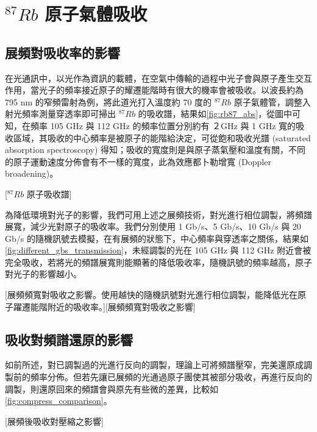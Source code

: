 \documentclass[class=NCU_thesis, crop=false]{standalone}
\begin{document}
\section{$^{87}Rb$ 原子氣體吸收}

\subsection{展頻對吸收率的影響}
\label{section:simulation_absorption}
在光通訊中，以光作為資訊的載體，在空氣中傳輸的過程中光子會與原子產生交互作用，當光子的頻率接近原子的耀遷能階時有很大的機率會被吸收。以波長約為 795  nm 的窄頻雷射為例，將此道光打入溫度約 70 度的 $^{87}Rb$ 原子氣體管，調整入射光頻率測量穿透率即可掃出 $^{87}Rb$ 的吸收譜，結果如\cref{fig:rb87_abs}，從圖中可知，在頻率 105 GHz 與 112 GHz 的頻率位置分別約有 ２GHz 與 1 GHz 寬的吸收區域，其吸收的中心頻率是被原子的能階給決定，可從飽和吸收光譜 (saturated absorption spectroscopy) 得知；吸收的寬度則是與原子蒸氣壓和溫度有關，不同的原子運動速度分佈會有不一樣的寬度，此為效應都卜勒增寬 (Doppler broadening)。

[$^{87}Rb$ 原子吸收譜]

為降低環境對光子的影響，我們可用上述之展頻技術，對光進行相位調製，將頻譜展寬，減少光對原子的吸收率。我們分別使用 1 Gb/s、5 Gb/s、10 Gb/s 與 20 Gb/s 的隨機訊號去模擬，在有展頻的狀態下，中心頻率與穿透率之關係，結果如\cref{fig:different_gbs_transmission}，未經調製的光在 105 GHz 與 112 GHz 附近會被完全吸收，若將光的頻譜展寬則能顯著的降低吸收率，隨機訊號的頻率越高，原子對光子的影響越小。

[展頻頻寬對吸收之影響。使用越快的隨機訊號對光進行相位調製，能降低光在原子躍遷能階附近的吸收率。][展頻頻寬對吸收之影響]

\subsection{吸收對頻譜還原的影響}
如前所述，對已調製過的光進行反向的調製，理論上可將頻譜壓窄，完美還原成調製前的頻率分佈。但若先讓已展頻的光通過原子團使其被部分吸收，再進行反向的調製，則還原回來的頻譜會與原先有些微的差異，比較如\cref{fig:compress_comparison}。

[展頻後吸收對壓縮之影響]

\end{document}
